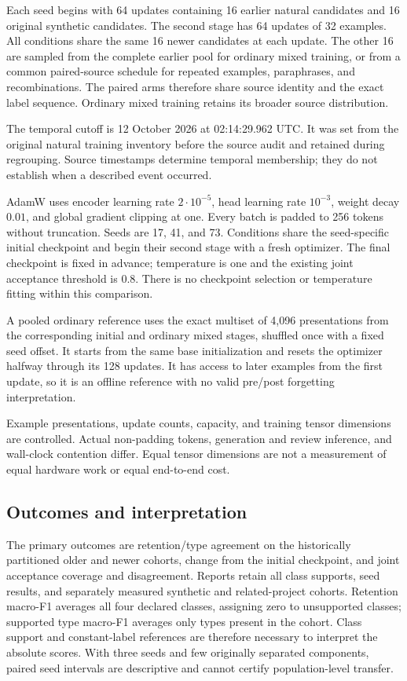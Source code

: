 Each seed begins with 64 updates containing 16 earlier natural candidates and 16 original synthetic candidates. The second stage has 64 updates of 32 examples. All conditions share the same 16 newer candidates at each update. The other 16 are sampled from the complete earlier pool for ordinary mixed training, or from a common paired-source schedule for repeated examples, paraphrases, and recombinations. The paired arms therefore share source identity and the exact label sequence. Ordinary mixed training retains its broader source distribution.

The temporal cutoff is 12 October 2026 at 02:14:29.962 UTC. It was set from the original natural training inventory before the source audit and retained during regrouping. Source timestamps determine temporal membership; they do not establish when a described event occurred.

AdamW uses encoder learning rate $2\cdot10^{-5}$, head learning rate $10^{-3}$, weight decay $0.01$, and global gradient clipping at one. Every batch is padded to 256 tokens without truncation. Seeds are 17, 41, and 73. Conditions share the seed-specific initial checkpoint and begin their second stage with a fresh optimizer. The final checkpoint is fixed in advance; temperature is one and the existing joint acceptance threshold is $0.8$. There is no checkpoint selection or temperature fitting within this comparison.

A pooled ordinary reference uses the exact multiset of 4,096 presentations from the corresponding initial and ordinary mixed stages, shuffled once with a fixed seed offset. It starts from the same base initialization and resets the optimizer halfway through its 128 updates. It has access to later examples from the first update, so it is an offline reference with no valid pre/post forgetting interpretation.

Example presentations, update counts, capacity, and training tensor dimensions are controlled. Actual non-padding tokens, generation and review inference, and wall-clock contention differ. Equal tensor dimensions are not a measurement of equal hardware work or equal end-to-end cost.

\subsection{Outcomes and interpretation}
The primary outcomes are retention/type agreement on the historically partitioned older and newer cohorts, change from the initial checkpoint, and joint acceptance coverage and disagreement. Reports retain all class supports, seed results, and separately measured synthetic and related-project cohorts. Retention macro-F1 averages all four declared classes, assigning zero to unsupported classes; supported type macro-F1 averages only types present in the cohort. Class support and constant-label references are therefore necessary to interpret the absolute scores. With three seeds and few originally separated components, paired seed intervals are descriptive and cannot certify population-level transfer.

